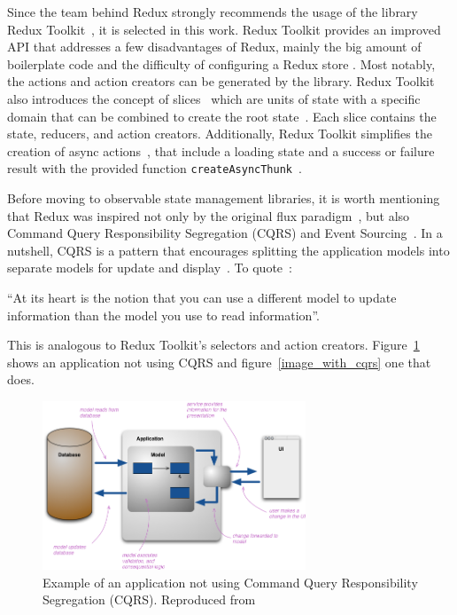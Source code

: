 Since the team behind Redux strongly recommends the usage of the
library Redux Toolkit~\cite{redux_style_guide}, it is selected in this work. Redux Toolkit
provides an improved API that addresses a few disadvantages of Redux, mainly the big amount of
boilerplate code and the difficulty of configuring a Redux store
\cite{why_redux_toolkit}. Most notably, the actions and action creators can be generated 
by the library. Redux Toolkit also introduces the concept of slices~\cite{redux_toolkit_slice} which are units of
state with a specific domain that can be combined to create the root
state~\cite{redux_toolkit_configure_store}. Each slice contains the state, reducers, and action
creators.
Additionally, Redux Toolkit simplifies the creation of async actions~\cite{redux_toolkit_async},
that include a loading state and a success or failure result with the
provided function \texttt{createAsyncThunk}~\cite{redux_toolkit_create_async_thunk}.

Before moving to observable state management libraries, it is worth
mentioning that Redux was inspired not only by the original flux
paradigm~\cite{flux}, but also Command Query
Responsibility Segregation (CQRS) and Event
Sourcing~\cite{redux_motivation}.
In a nutshell, CQRS is a pattern that encourages splitting the
application models into separate models for update and
display~\cite{cqrs}. To quote~\cite{cqrs}:

``At its heart is the notion that you can use a different model to
update information than the model you use to read information''.

This is analogous to Redux Toolkit's selectors and action creators.
Figure~\ref{image_without_cqrs} shows an application not using CQRS
and figure~\ref{image_with_cqrs} one that does.

\begin{figure}
\centering
\includegraphics[width=0.7\textwidth]{images/Untitled_9.png}
\caption{Example of an application not using Command Query
Responsibility Segregation (CQRS). Reproduced from~\cite{cqrs}}
\label{image_without_cqrs}
\end{figure}


